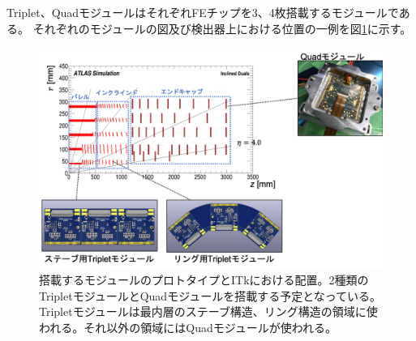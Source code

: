 Triplet、QuadモジュールはそれぞれFEチップを3、4枚搭載するモジュールである。
それぞれのモジュールの図及び検出器上における位置の一例を図\ref{module_geom}に示す。

\begin{figure}[bpt]\centering
\includegraphics[width=12cm]{module_geom}
\caption[搭載するモジュールのプロトタイプとITkにおける配置。]{搭載するモジュールのプロトタイプとITkにおける配置。2種類のTripletモジュールとQuadモジュールを搭載する予定となっている。Tripletモジュールは最内層のステーブ構造、リング構造の領域に使われる。それ以外の領域にはQuadモジュールが使われる。}
\label{module_geom}
\end{figure}


